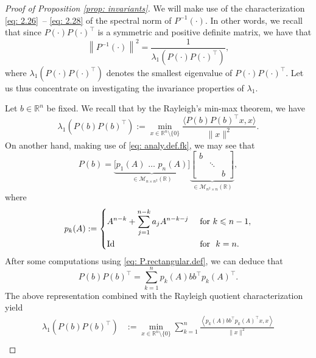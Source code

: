 \documentclass[journal,twoside,web]{ieeecolor}
\newcommand{\R}{\mathbb{R}}
\begin{document}
	\begin{proof}[Proof of Proposition \ref{prop: invariants}]
	We will make use of the characterization \eqref{eq: 2.26} -- \eqref{eq: 2.28} of the spectral norm of $P^{-1}(\cdot)$. In other words, we recall that since $P(\cdot)P(\cdot)^\top$ is a symmetric and positive definite matrix, we have that
	\begin{equation}
	\left\|P^{-1}(\cdot)\right\|^2 = \frac{1}{\lambda_1\left(P(\cdot)P(\cdot)^\top\right)},
	\end{equation}
	where $\lambda_1\left(P(\cdot)P(\cdot)^\top\right)$ denotes the smallest eigenvalue of $P(\cdot)P(\cdot)^\top$.
	Let us thus concentrate on investigating the invariance properties of $\lambda_1$. 
	
	Let $b\in\R^n$ be fixed. We recall that by the Rayleigh's min-max theorem, we have
	\begin{equation*}
	\lambda_1\left(P(b)P(b)^\top\right) := 
	 \min_{x \in \R^n \setminus\{0\}} \frac{\langle P(b)P(b)^\top x, x\rangle}{\|x\|^2}.
	 \end{equation*}
	 On another hand, making use of \eqref{eq: analy.def.fk}, we may see that  
	\begin{equation} \label{eq: P.rectangular.def}
	P(b) = \underbrace{\big[p_1(A)\,\, \ldots\,\, p_n(A)\big]}_{\in \mathcal{M}_{n\times n^2}(\R)} \underbrace{\begin{bmatrix} b & &\\
	 &\ddots & \\
	 & & b
	 \end{bmatrix}}_{\in\mathcal{M}_{n^2\times n}(\R)},
	\end{equation}
	where 
	\begin{equation}
	p_k(A) := \begin{dcases}A^{n-k} + \sum_{j=1}^{n-k} a_{j} A^{n-k-j} &\text{ for } k\leqslant n-1,\\
	\text{Id} &\text{ for } k=n.
	\end{dcases}
	\end{equation}
	After some computations using \eqref{eq: P.rectangular.def}, we can deduce that
	\begin{equation} \label{eq: pp*.char}
	P(b)P(b)^\top = \sum_{k=1}^n p_k(A)bb^\top p_k(A)^\top.
	\end{equation}
	The above representation combined with the Rayleigh quotient characterization yield
	\begin{align*}
	\lambda_1\left(P(b)P(b)^\top\right) &:= \min_{x \in \R^n \setminus\{0\}} \sum_{k=1}^n \frac{\left\langle p_k(A)bb^\top p_k(A)^\top x, x\right\rangle}{\|x\|^2}\\

\end{align*}
\end{proof}
\end{document}
